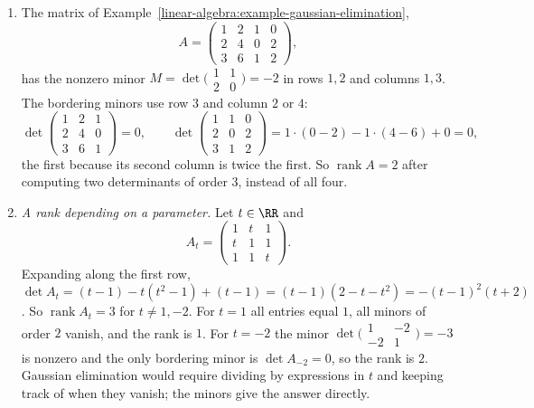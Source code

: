 \begin{example}\label{linear-algebra:example-bordered-minors}
\begin{enumerate}
\item The matrix of Example~\ref{linear-algebra:example-gaussian-elimination},
\[
A = \begin{pmatrix}1 & 2 & 1 & 0\\ 2 & 4 & 0 & 2\\ 3 & 6 & 1 & 2\end{pmatrix},
\]
has the nonzero minor $M = \det\bigl(\begin{smallmatrix}1 & 1\\ 2 & 0\end{smallmatrix}\bigr) = -2$ in rows $1, 2$ and columns $1, 3$. The bordering minors use row $3$ and column $2$ or $4$:
\[
\det\begin{pmatrix}1 & 2 & 1\\ 2 & 4 & 0\\ 3 & 6 & 1\end{pmatrix} = 0, \qquad \det\begin{pmatrix}1 & 1 & 0\\ 2 & 0 & 2\\ 3 & 1 & 2\end{pmatrix} = 1 \cdot (0 - 2) - 1 \cdot (4 - 6) + 0 = 0,
\]
the first because its second column is twice the first. So $\operatorname{rank}A = 2$ after computing two determinants of order $3$, instead of all four.
\item \emph{A rank depending on a parameter.} Let $t \in \RR$ and
\[
A_t = \begin{pmatrix}1 & t & 1\\ t & 1 & 1\\ 1 & 1 & t\end{pmatrix}.
\]
Expanding along the first row, $\det A_t = (t - 1) - t(t^2 - 1) + (t - 1) = (t - 1)(2 - t - t^2) = -(t - 1)^2(t + 2)$. So $\operatorname{rank}A_t = 3$ for $t \neq 1, -2$. For $t = 1$ all
entries equal $1$, all minors of order $2$ vanish, and the rank is $1$. For $t = -2$ the minor $\det\bigl(\begin{smallmatrix}1 & -2\\ -2 & 1\end{smallmatrix}\bigr) = -3$ is nonzero and the only bordering
minor is $\det A_{-2} = 0$, so the rank is $2$. Gaussian elimination would require dividing by expressions in $t$ and keeping track of when they vanish; the minors give the answer directly.
\end{enumerate}
\end{example}

